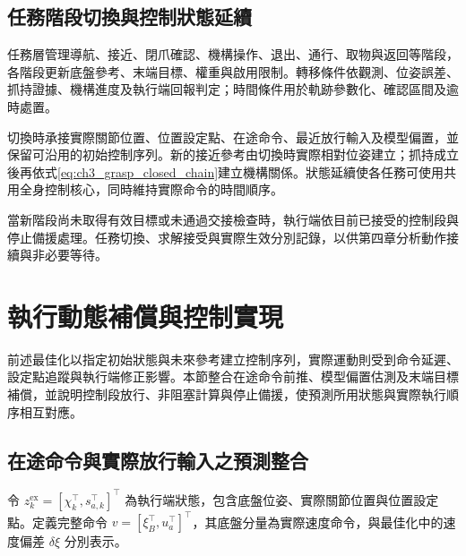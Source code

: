 \subsection{任務階段切換與控制狀態延續}
\label{subsec:task_transition_continuity}

任務層管理導航、接近、閉爪確認、機構操作、退出、通行、取物與返回等階段，各階段更新底盤參考、末端目標、權重與啟用限制。轉移條件依觀測、位姿誤差、抓持證據、機構進度及執行端回報判定；時間條件用於軌跡參數化、確認區間及逾時處置。

切換時承接實際關節位置、位置設定點、在途命令、最近放行輸入及模型偏置，並保留可沿用的初始控制序列。新的接近參考由切換時實際相對位姿建立；抓持成立後再依式\eqref{eq:ch3_grasp_closed_chain}建立機構關係。狀態延續使各任務可使用共用全身控制核心，同時維持實際命令的時間順序。

當新階段尚未取得有效目標或未通過交接檢查時，執行端依目前已接受的控制段與停止備援處理。任務切換、求解接受與實際生效分別記錄，以供第四章分析動作接續與非必要等待。



\section{執行動態補償與控制實現}
\label{sec:execution_compensation}

前述最佳化以指定初始狀態與未來參考建立控制序列，實際運動則受到命令延遲、設定點追蹤與執行端修正影響。本節整合在途命令前推、模型偏置估測及末端目標補償，並說明控制段放行、非阻塞計算與停止備援，使預測所用狀態與實際執行順序相互對應。


\subsection{在途命令與實際放行輸入之預測整合}
\label{subsec:queued_applied_command_prediction}

令 $z_k^{\mathrm{ex}}=[\chi_k^{\top},s_{a,k}^{\top}]^{\top}$ 為執行端狀態，包含底盤位姿、實際關節位置與位置設定點。定義完整命令 $v=[\xi_B^{\top},u_a^{\top}]^{\top}$，其底盤分量為實際速度命令，與最佳化中的速度偏差 $\delta\xi$ 分別表示。

